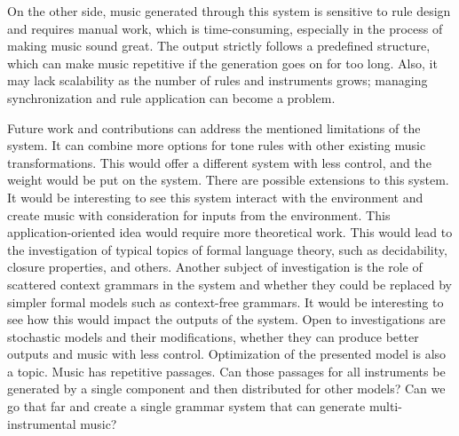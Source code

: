On the other side, music generated through this system is sensitive to rule design and requires manual work, which is time-consuming, especially in the process of making music sound great. The output strictly follows a predefined structure, which can make music repetitive if the generation goes on for too long. Also, it may lack scalability as the number of rules and instruments grows; managing synchronization and rule application can become a problem.

Future work and contributions can address the mentioned limitations of the system. It can combine more options for tone rules with other existing music transformations. This would offer a different system with less control, and the weight would be put on the system. There are possible extensions to this system. It would be interesting to see this system interact with the environment and create music with consideration for inputs from the environment. This application-oriented idea would require more theoretical work. This would lead to the investigation of typical topics of formal language theory, such as decidability, closure properties, and others. Another subject of investigation is the role of scattered context grammars in the system and whether they could be replaced by simpler formal models such as context-free grammars. It would be interesting to see how this would impact the outputs of the system. Open to investigations are stochastic models and their modifications, whether they can produce better outputs and music with less control. Optimization of the presented model is also a topic. Music has repetitive passages. Can those passages for all instruments be generated by a single component and then distributed for other models? Can we go that far and create a single grammar system that can generate multi-instrumental music?


